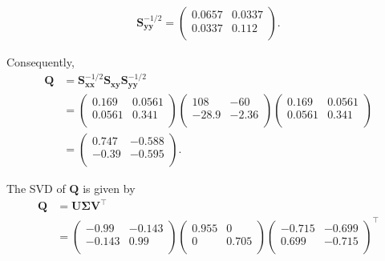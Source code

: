 \documentclass[]{book}
\theoremstyle{definition}
\theoremstyle{definition}
\theoremstyle{definition}
\theoremstyle{remark}
\begin{document}
\begin{align*}
\mathbf S_{\mathbf y\mathbf y}^{-1/2}= \begin{pmatrix}0.0657&0.0337 \\0.0337&0.112 \\\end{pmatrix}.
\end{align*}

Consequently,
\begin{align*}
\mathbf Q&=\mathbf S_{\mathbf x\mathbf x}^{-1/2}\mathbf S_{\mathbf x\mathbf y}\mathbf S_{\mathbf y\mathbf y}^{-1/2}\\
&=\begin{pmatrix}0.169&0.0561 \\0.0561&0.341 \\\end{pmatrix} \begin{pmatrix}108&-60 \\-28.9&-2.36 \\\end{pmatrix}\begin{pmatrix}0.169&0.0561 \\0.0561&0.341 \\\end{pmatrix}\\
&=\begin{pmatrix}0.747&-0.588 \\-0.39&-0.595 \\\end{pmatrix}.
\end{align*}

The SVD of \(\mathbf Q\) is given by
\begin{align}
\mathbf Q&=\mathbf U{\pmb \Sigma} \mathbf V^\top \nonumber \\
&=\begin{pmatrix}-0.99&-0.143 \\-0.143&0.99 \\\end{pmatrix} \begin{pmatrix}0.955&0 \\0&0.705 \\\end{pmatrix}\begin{pmatrix}-0.715&-0.699 \\0.699&-0.715 \\\end{pmatrix}^\top
\label{eq:SVDanalysis}
\end{align}
\end{document}
